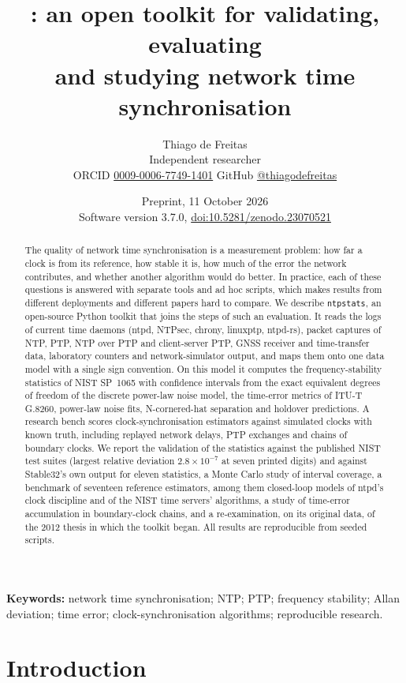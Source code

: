 \documentclass[11pt,a4paper]{article}
\title{\ntp: an open toolkit for validating, evaluating\\ and studying network time synchronisation}
\author{Thiago de Freitas\\[2pt]
\small Independent researcher\\
\small ORCID \href{https://orcid.org/0009-0006-7749-1401}{0009-0006-7749-1401}\quad
GitHub \href{https://github.com/thiagodefreitas}{@thiagodefreitas}}
\date{Preprint, 11 October 2026\\[2pt]\small Software version 3.7.0, \href{https://doi.org/10.5281/zenodo.23070521}{doi:10.5281/zenodo.23070521}}
\newcommand{\ntp}{\texttt{ntpstats}}
\begin{document}
\maketitle

\begin{abstract}
\noindent
The quality of network time synchronisation is a measurement problem: how far a clock is from its
reference, how stable it is, how much of the error the network contributes, and whether another
algorithm would do better. In practice, each of these questions is answered with separate tools and ad
hoc scripts, which makes results from different deployments and different papers hard to compare. We
describe \ntp, an open-source Python toolkit that joins the steps of such an evaluation. It reads the
logs of current time daemons (ntpd, NTPsec, chrony, linuxptp, ntpd-rs), packet captures of NTP, PTP,
NTP over PTP and client-server PTP, GNSS receiver and time-transfer data, laboratory counters and
network-simulator output, and maps them onto one data model with a single sign convention. On this
model it computes the frequency-stability statistics of NIST SP~1065 with confidence intervals from
the exact equivalent degrees of freedom of the discrete power-law noise model, the time-error metrics
of ITU-T G.8260, power-law noise fits, N-cornered-hat separation and holdover predictions. A research
bench scores clock-synchronisation estimators against simulated clocks with known truth, including
replayed network delays, PTP exchanges and chains of boundary clocks. We report the validation of the
statistics against the published NIST test suites (largest relative deviation $2.8\times10^{-7}$ at seven
printed digits) and against Stable32's own output for eleven statistics, a Monte Carlo study of interval
coverage, a benchmark of seventeen reference
estimators, among them closed-loop models of ntpd's clock discipline and of the NIST time servers'
algorithms, a study of time-error accumulation in boundary-clock chains, and a re-examination, on its
original data, of the 2012 thesis in which the toolkit began. All results are reproducible from seeded
scripts.
\end{abstract}

\noindent\textbf{Keywords:} network time synchronisation; NTP; PTP; frequency stability; Allan deviation;
time error; clock-synchronisation algorithms; reproducible research.

\section{Introduction}\label{sec:intro}
\end{document}
